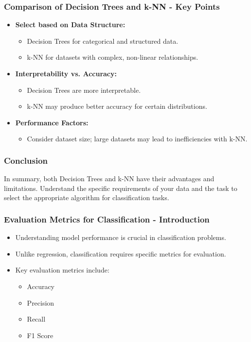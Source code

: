 \documentclass[aspectratio=169]{beamer}
\begin{document}
\begin{frame}[fragile]
    \frametitle{Comparison of Decision Trees and k-NN - Key Points}
    \begin{itemize}
        \item \textbf{Select based on Data Structure:} 
            \begin{itemize}
                \item Decision Trees for categorical and structured data.
                \item k-NN for datasets with complex, non-linear relationships.
            \end{itemize}
        \item \textbf{Interpretability vs. Accuracy:} 
            \begin{itemize}
                \item Decision Trees are more interpretable.
                \item k-NN may produce better accuracy for certain distributions.
            \end{itemize}
        \item \textbf{Performance Factors:} 
            \begin{itemize}
                \item Consider dataset size; large datasets may lead to inefficiencies with k-NN.
            \end{itemize}
    \end{itemize}
\end{frame}

\begin{frame}[fragile]
    \frametitle{Conclusion}
    In summary, both Decision Trees and k-NN have their advantages and limitations. Understand the specific requirements of your data and the task to select the appropriate algorithm for classification tasks.
\end{frame}

\begin{frame}[fragile]
    \frametitle{Evaluation Metrics for Classification - Introduction}
    \begin{itemize}
        \item Understanding model performance is crucial in classification problems.
        \item Unlike regression, classification requires specific metrics for evaluation.
        \item Key evaluation metrics include:
        \begin{itemize}
            \item Accuracy
            \item Precision
            \item Recall
            \item F1 Score
        \end{itemize}
    \end{itemize}
\end{frame}
\end{document}
